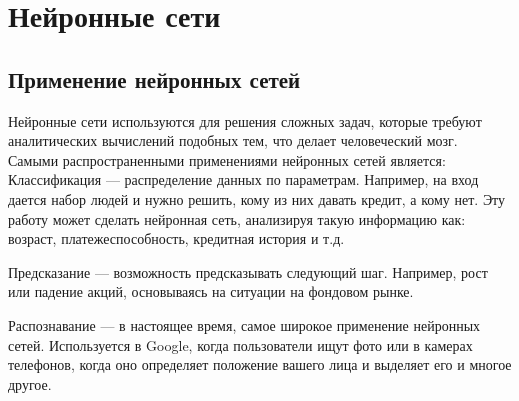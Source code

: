 \newpage

\chapter{Нейронные сети}
\section{Применение нейронных сетей}

Нейронные сети используются для решения сложных задач, которые требуют аналитических вычислений подобных тем, что делает человеческий мозг. Самыми распространенными применениями нейронных сетей является:
Классификация — распределение данных по параметрам. Например, на вход дается набор людей и нужно решить, кому из них давать кредит, а кому нет. Эту работу может сделать нейронная сеть, анализируя такую информацию как: возраст, платежеспособность, кредитная история и т.д.

Предсказание — возможность предсказывать следующий шаг. Например, рост или падение акций, основываясь на ситуации на фондовом рынке.

Распознавание — в настоящее время, самое широкое применение нейронных сетей. Используется в Google, когда пользователи ищут фото или в камерах телефонов, когда оно определяет положение вашего лица и выделяет его и многое другое.
